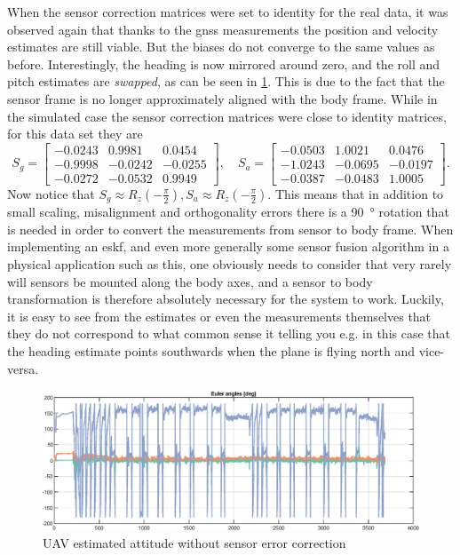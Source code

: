 When the sensor correction matrices were set to identity for the real data, it was observed again that thanks to the \acrshort{gnss} measurements the position and velocity estimates are still viable. But the biases do not converge to the same values as before. Interestingly, the heading is now mirrored around zero, and the roll and pitch estimates are \textit{swapped}, as can be seen in \cref{fig:ga_2_real_bad}. This is due to the fact that the sensor frame is no longer approximately aligned with the body frame. While in the simulated case the sensor correction matrices were close to identity matrices, for this data set they are
\begin{equation}
    S_g = \begin{bmatrix}
        -0.0243 & 0.9981  & 0.0454 \\
        -0.9998 & -0.0242 & -0.0255 \\
        -0.0272 & -0.0532 & 0.9949
    \end{bmatrix}, \quad
    S_a = \begin{bmatrix}
        -0.0503 & 1.0021  & 0.0476 \\
        -1.0243 & -0.0695 & -0.0197 \\
        -0.0387 & -0.0483 & 1.0005
    \end{bmatrix}.
\end{equation}
Now notice that $S_g \approx R_z(-\frac{\pi}{2}), S_a \approx R_z(-\frac{\pi}{2})$. This means that in addition to small scaling, misalignment and orthogonality errors there is a \SI{90}{\degree} rotation that is needed in order to convert the measurements from sensor to body frame. When implementing an \acrshort{eskf}, and even more generally some sensor fusion algorithm in a physical application such as this, one obviously needs to consider that very rarely will sensors be mounted along the body axes, and a sensor to body transformation is therefore absolutely necessary for the system to work. Luckily, it is easy to see from the estimates or even the measurements themselves that they do not correspond to what common sense it telling you e.g. in this case that the heading estimate points southwards when the plane is flying north and vice-versa. 

\begin{figure}[!htb]
    \centering
    \includegraphics[width=0.6\linewidth]{figures/ga_2/real_bad_heading.eps}
    \caption{UAV estimated attitude without sensor error correction}
    \label{fig:ga_2_real_bad}
\end{figure}


